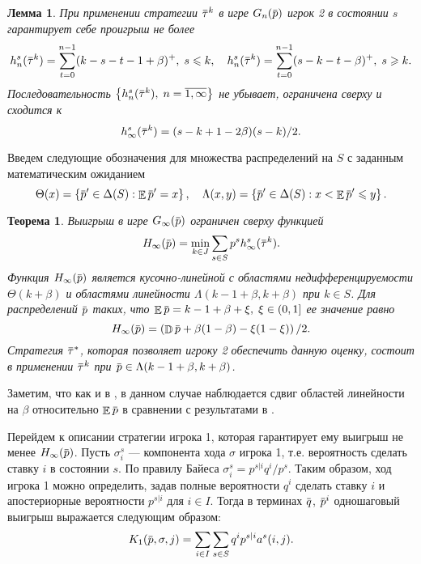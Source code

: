 \documentclass[12pt, draft]{extarticle}
\newtheorem{lemma}{Лемма}
\newtheorem{theorem}{Теорема}
\newcommand{\overbar}[1]%
{\mkern 1.5mu\overline{\mkern-1.3mu#1\mkern-1.3mu}\mkern 1.3mu}
\newcommand{\p}{\ensuremath{\overbar{p}}}
\newcommand{\q}{\ensuremath{\overbar{q}}}
\DeclareMathOperator{\E}{\mathbb{E}}
\DeclareMathOperator{\D}{\mathbb{D}}
\newcommand{\G}[1][n]{\ensuremath{G_{#1}}}
\newcommand{\K}[1][n]{\ensuremath{K_{#1}}}
\newcommand{\High}[1][\ensuremath{\infty}]{\ensuremath{H_{#1}}}
\newcommand{\tauv}{\ensuremath{\overbar{\tau}}}
\begin{document}
\begin{lemma}
  \label{upper-bound:lemma:vector-payoffs}
  При применении стратегии $\tauv^k$ в игре $\G(\p)$ игрок 2 в состоянии $s$
  гарантирует себе проигрыш не более
  \begin{gather*}
    h^s_n(\tauv^k) = \sum_{t=0}^{n-1} (k-s-t-1+\beta)^+, \; s \leqslant k, \quad
    h^s_n(\tauv^k) = \sum_{t=0}^{n-1} (s-k-t-\beta)^+, \; s \geqslant k.
  \end{gather*}
  Последовательность $\left\{ h^s_n(\tauv^k), \; n = \overline{1, \infty}
  \right\}$ не убывает, ограничена сверху и сходится к %
  \begin{equation}
    \label{upper-bound:eq:max-payoff}
    h^s_\infty(\tauv^k) = (s - k + 1 - 2\beta)(s-k)/2.
  \end{equation}
\end{lemma}

Введем следующие обозначения для множества распределений на $S$ с заданным
математическим ожиданием
\begin{equation*}
  \Theta(x) = \left\{ \p' \in \Delta(S): \E \p' = x \right\}, \quad
  \Lambda(x, y) = \left\{ \p' \in \Delta(S): x < \E \p' \leqslant y \right\}.
\end{equation*}

\begin{theorem}
  \label{upper-bound:theorem}
  Выигрыш в игре $\G[\infty](\p)$ ограничен сверху функцией
  \begin{equation*}
    \High(\p) = \min_{k \in J} \sum_{s \in S} p^s  h^s_\infty(\tauv^k).
  \end{equation*}
  Функция $\High(\p)$ является кусочно-линейной с областями недифференцируемости
  $\Theta(k+\beta)$ и областями линейности $\Lambda(k - 1 + \beta, k + \beta)$
  при $k \in S$. Для распределений $\p$ таких, что $\E \p = k - 1 + \beta + \xi,
  \; \xi \in (0, 1]$ ее значение равно
  \begin{equation}
    \label{upper-bound:eq:H(p)}
    \High(\p) = \left( \D \p + \beta(1-\beta) - \xi(1-\xi) \right)/2.
  \end{equation}
  Стратегия $\tauv^*$, которая позволяет игроку 2 обеспечить данную оценку,
  состоит в применении $\tauv^k$ при $\p \in \Lambda(k - 1 + \beta, k + \beta)$.
\end{theorem}
Заметим, что как и в \cite{bib:pyanykh16}, в данном случае наблюдается сдвиг
областей линейности на $\beta$ относительно $\E \p$ в сравнении с результатами в
\cite{bib:domansky11}.

Перейдем к описании стратегии игрока 1, которая гарантирует ему выигрыш не менее
$\High(\p)$. Пусть $\sigma^s_i$ --- компонента хода $\sigma$ игрока 1, т.е.
вероятность сделать ставку $i$ в состоянии $s$. По правилу Байеса $\sigma^s_i =
p^{s|i} q^i / p^s$. Таким образом, ход игрока 1 можно определить, задав полные
вероятности $q^i$ сделать ставку $i$ и апостериорные вероятности $p^{s|i}$ для
$i \in I$. Тогда в терминах $\q$, $\p^i$ одношаговый выигрыш выражается
следующим образом:
\begin{equation}
  \label{lower-bound:eq:K1(q,pi)}
  \K[1](\p, \sigma, j) = \sum_{i \in I} \sum_{s \in S} q^i p^{s|i} a^s(i, j).
\end{equation}
\end{document}
